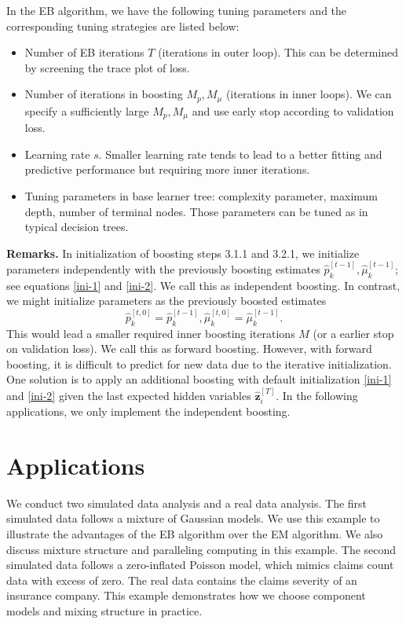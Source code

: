 \documentclass[11pt]{article}
\numberwithin{equation}{section}
\def\bz{\boldsymbol{z}}
\begin{document}
In the EB algorithm, we have the following tuning parameters and the corresponding tuning strategies are listed below:
	\begin{itemize}
		\item Number of EB iterations {$T$} (iterations in outer loop). This can be determined by screening the trace plot of loss.
		\item Number of iterations in boosting {$M_p,M_\mu$} (iterations in inner loops). We can specify a sufficiently large $M_p,M_\mu$ and use  early stop according to validation loss.
		\item Learning rate {$s$}. Smaller learning rate tends to lead to a better fitting and predictive performance but requiring more inner iterations.
		\item Tuning parameters in base learner tree: complexity parameter, maximum depth, number of terminal nodes. Those parameters can be tuned as in typical decision trees.
	\end{itemize}

		
{\bf Remarks.}
	In initialization of boosting steps 3.1.1 and 3.2.1, we initialize parameters {independently} with the previously boosting estimates $\hat{p}_k^{[t-1]}, \hat{\mu}_k^{[t-1]}$; see equations \eqref{ini-1} and \eqref{ini-2}. We call this as independent boosting.
	In contrast, we might initialize parameters as the previously boosted estimates $$\hat{p}_k^{[t,0]}=\hat{p}_k^{[t-1]}, \hat{\mu}_k^{[t,0]}=\hat{\mu}_k^{[t-1]}.$$
		This would lead a {smaller} required inner boosting iterations $M$ (or a {earlier} stop on validation loss). 
	We call this as forward boosting. 
	However, with forward boosting, it is difficult to predict for new data due to the {iterative initialization}. One solution is to apply an additional boosting with default initialization \eqref{ini-1} and \eqref{ini-2} given the {last expected hidden variables $\hat{\bz}_i^{[T]}$}. In the following applications, we only implement the independent boosting.
			
\section{Applications}\label{sec:application}

We conduct two simulated data analysis and a real data analysis. 
The first simulated data follows a mixture of Gaussian models. 
We use this example to illustrate the advantages of the EB algorithm over the EM algorithm.
We also discuss mixture structure and paralleling computing in this example.
The second simulated data follows a zero-inflated Poisson model, which mimics claims count data with excess of zero.
The real data contains the claims severity of an insurance company. This example demonstrates how we choose component models and mixing structure in practice.
\end{document}

